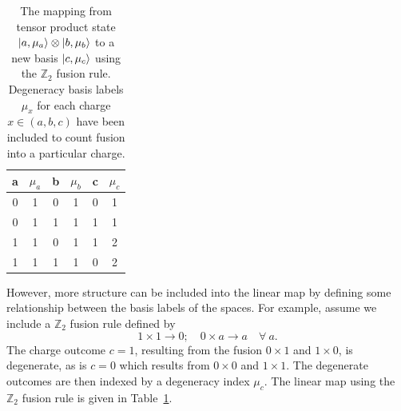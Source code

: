 \documentclass[aps,reprint,superscriptaddress,amsmath,amssymb,amsfonts,prb]{revtex4-1}
\begin{document}
\begin{table}
\begin{ruledtabular}
\begin{tabular}{  c  c  c  c  c  c  }
a  &  $\mu_a$  &  b   &  $\mu_b$  &   c   & $\mu_c$   \\ \hline
0  &    1    &  0   &     1   &   0   &   1            \\ 
0  &    1    &  1   &     1   &   1   &   1             \\  
1  &    1    &  0   &     1   &   1   &   2              \\ 
1  &    1    &  1   &     1   &   0   &   2               \\ 
\end{tabular}
\end{ruledtabular}
\caption{The mapping from tensor product state $\ket{a,\mu_a}\otimes \ket{b,\mu_b}$ to a new basis $\ket{c,\mu_c}$ using the $\mathbb{Z}_2$ fusion rule. Degeneracy basis labels $\mu_x$ for each charge $x  \in (a,b,c)$ have been included to count fusion into a particular charge.\label{MappingVectorSpaceZ2}}
\end{table}

However, more structure can be included into the linear map by defining some relationship between the basis labels of the spaces. For example, assume we include a $\mathbb{Z}_2$ fusion rule defined by
\begin{equation}
1 \times 1 \rightarrow 0;   \quad 0 \times a \rightarrow a \quad \forall ~a .
\end{equation}
The charge outcome $c = 1$, resulting from the fusion $0 \times 1$ and $1 \times 0$, is degenerate, as is $c=0$ which results from $0\times 0$ and $1\times 1$. The degenerate outcomes are then indexed by a degeneracy index $\mu_c$. The linear map using the $\mathbb{Z}_2$ fusion rule is given in Table~\ref{MappingVectorSpaceZ2}. 
\end{document}
